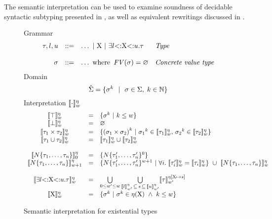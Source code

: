 The semantic interpretation can be used to examine soundness
of decidable syntactic subtyping presented in ,
as well as equivalent rewritings discussed in .

\begin{figure}[t]
\footnotesize
Grammar
\[\begin{array}{rcll}
    \tau, l, u &::=& \ldots ~\vert~ \mathrm{X} ~\vert~
        \exists l{\operatorname{<:}}\mathrm{X}{\operatorname{<:}}u.\tau
        & \textit{Type} \\
    \\
    \sigma &::=& \ldots \text{ where } \operatorname{\mathit{FV}}(\sigma) = \varnothing
        & \textit{Concrete value type} \\
\end{array}\]
Domain
\[
    \hat{\Sigma} = \{ \sigma^k \ ~\vert~\ \sigma \in \Sigma,\; k \in \mathbb{N} \}
\]
Interpretation $\llbracket \cdot \rrbracket^{\eta}_w$
\[
\begin{array}{ccl}
    \interpexdflt{\tyany} &=& \{ \gty^k \ |\ k \leq w \} \\
    \interpexdflt{\tybot} &=& \varnothing \\
    \interpexdflt{\typair{\ty_1}{\ty_2}} &=& 
        \{ {(\typair{\gty_1}{\gty_2})}^k \ | \ 
        {\gty_1}^k \in \interpexdflt{\ty_1},\,
        {\gty_2}^k \in \interpexdflt{\ty_2} \} \\
    \interpexdflt{\tyunion{\ty_1}{\ty_2}} &=& 
        \interpexdflt{\ty_1} \cup \interpexdflt{\ty_2} \\
    \\
    \interp{\tyinv\iname{\ty_1,\ldots,\ty_n}}^{\semsubstvars}_0 &=& 
        \{ \tyinv\iname{\ty'_1,\ldots,\ty'_n}^0 \} \\
    \interp{\tyinv\iname{\ty_1,\ldots,\ty_n}}^{\semsubstvars}_{w+1} &=& 
        \{ \tyinv\iname{\ty'_1,\ldots,\ty'_n}^{w+1} \ |\ 
            \forall i.\; \interpexdflt{\ty'_i} = \interpexdflt{\ty_i} \}
        \ \cup\ \interp{\tyinv\iname{\ty_1,\ldots,\ty_n}}^{\semsubstvars}_w \\
    \\
    \interpexdflt{\tyexist{\vx}{\tylb}{\tyub}{\ty}} &=& 
        \bigcup\limits_{0 \leq w' \leq w}
        \bigcup\limits_{\interp{\tylb}^{\semsubstvars}_{w'}
            \, \subseteq\, \gtyset\,
            \subseteq\, \interp{\tyub}^{\semsubstvars}_{w'}}
        \interp{\ty}^{\subst{\semsubstvars}{\substel{\vx\,}{\,\gtyset}}}_{w'} \\
    \interpexdflt{\vx} &=& \{ \gty^k \ |\ 
        \gty^k \in \semsubstvars(\vx)\ \land\ k \leq w \} \\
\end{array}
\]
\caption{Semantic interpretation for
existential types}\label{fig:sem:ty-inv-exist}
\end{figure}


